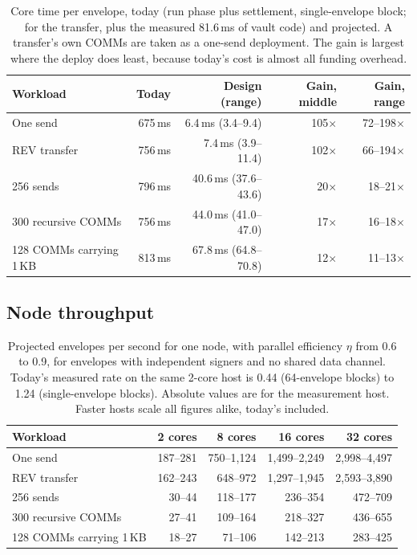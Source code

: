 \documentclass[11pt]{article}
\begin{document}
\begin{table}[h]
\centering\small
\begin{tabular}{@{}lrrrr@{}}
\toprule
\textbf{Workload} & \textbf{Today} & \textbf{Design (range)} & \textbf{Gain, middle} & \textbf{Gain, range} \\
\midrule
One send & 675\,ms & 6.4\,ms (3.4--9.4) & 105$\times$ & 72--198$\times$ \\
REV transfer & 756\,ms & 7.4\,ms (3.9--11.4) & 102$\times$ & 66--194$\times$ \\
256 sends & 796\,ms & 40.6\,ms (37.6--43.6) & 20$\times$ & 18--21$\times$ \\
300 recursive COMMs & 756\,ms & 44.0\,ms (41.0--47.0) & 17$\times$ & 16--18$\times$ \\
128 COMMs carrying 1\,KB & 813\,ms & 67.8\,ms (64.8--70.8) & 12$\times$ & 11--13$\times$ \\
\bottomrule
\end{tabular}
\caption{Core time per envelope, today (run phase plus settlement, single-envelope block; for the transfer, plus the measured 81.6\,ms of vault code) and projected. A transfer's own COMMs are taken as a one-send deployment. The gain is largest where the deploy does least, because today's cost is almost all funding overhead.}
\label{tab:gain}
\end{table}

\subsection{Node throughput}

\begin{table}[h]
\centering\small
\begin{tabular}{@{}lrrrr@{}}
\toprule
\textbf{Workload} & \textbf{2 cores} & \textbf{8 cores} & \textbf{16 cores} & \textbf{32 cores} \\
\midrule
One send & 187--281 & 750--1{,}124 & 1{,}499--2{,}249 & 2{,}998--4{,}497 \\
REV transfer & 162--243 & 648--972 & 1{,}297--1{,}945 & 2{,}593--3{,}890 \\
256 sends & 30--44 & 118--177 & 236--354 & 472--709 \\
300 recursive COMMs & 27--41 & 109--164 & 218--327 & 436--655 \\
128 COMMs carrying 1\,KB & 18--27 & 71--106 & 142--213 & 283--425 \\
\bottomrule
\end{tabular}
\caption{Projected envelopes per second for one node, with parallel efficiency $\eta$ from 0.6 to 0.9, for envelopes with independent signers and no shared data channel. Today's measured rate on the same 2-core host is 0.44 (64-envelope blocks) to 1.24 (single-envelope blocks). Absolute values are for the measurement host. Faster hosts scale all figures alike, today's included.}
\label{tab:throughput}
\end{table}
\end{document}
